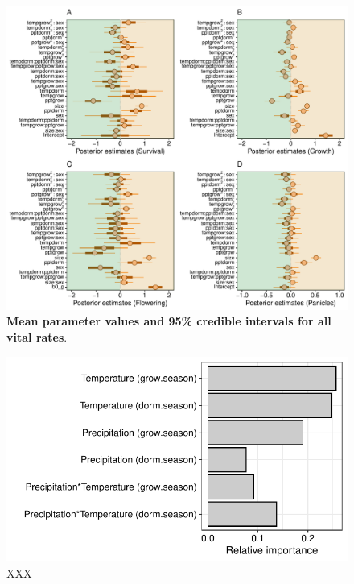 \documentclass[12pt]{article}
\begin{document}
\begin{figure}[H]
		\centering
		\includegraphics[width=0.95\linewidth]{Figures/Posterior_mean.pdf}
		\caption{\textbf{Mean parameter values and 95\% credible intervals for all vital rates}. }
		\label{Sup:Posterior}
\end{figure}

\begin{figure}[H]
  \begin{center}
    \includegraphics[width=0.85\linewidth]{Figures/Fig_LTRE.pdf}
  \caption{XXX}
  \label{Sup:LTRE}
  \end{center}
\end{figure}
\end{document}

